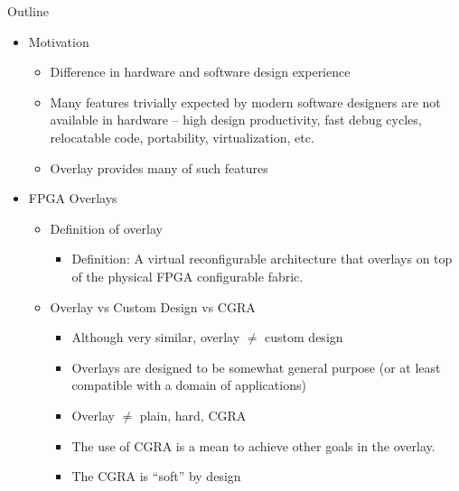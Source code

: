 \begin{center}
\Large Outline
\end{center}

\begin{raggedleft}
\footnotesize

\begin{itemize}[nosep]
\item Motivation
\begin{itemize}[nosep]
\item Difference in hardware and software design experience
\item Many features trivially expected by modern software designers are not available in hardware -- high design productivity, fast debug cycles, relocatable code, portability, virtualization, etc.
\item  Overlay provides many of such features
\end{itemize} %
\item FPGA Overlays

\begin{itemize}[nosep] %

\item
Definition of overlay
\begin{itemize}[nosep]
\item Definition: A virtual reconfigurable architecture that overlays on top of the physical FPGA configurable fabric.
\end{itemize}

\item
Overlay vs Custom Design vs CGRA
\begin{itemize}[nosep]
\item  Although very similar, overlay $\ne$ custom design
\item Overlays are designed to be somewhat general purpose (or at least compatible with a domain of applications)
\item  Overlay $\ne$ plain, hard, CGRA
\item The use of CGRA is a mean to achieve other goals in the overlay.
\item  The CGRA is ``soft'' by design
\end{itemize}


\end{itemize}
\end{itemize}
\end{raggedleft}
